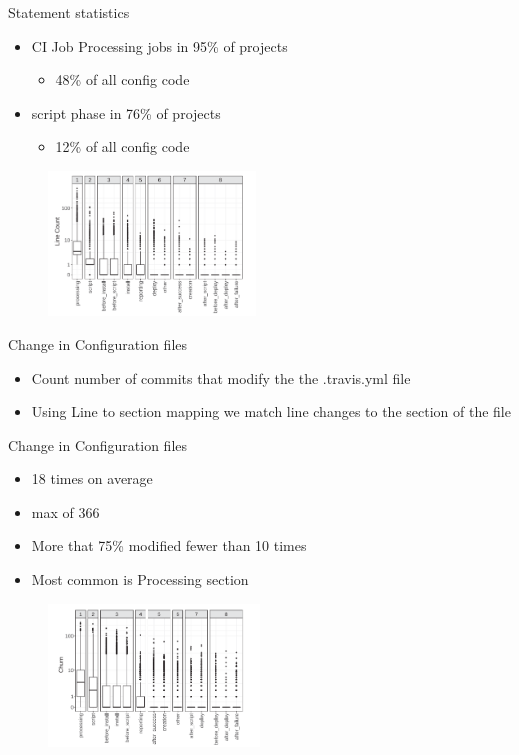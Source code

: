 \documentclass[aspectratio=169,xcolor=dvipsnames]{beamer}
\begin{document}
\begin{frame}{Statement statistics}
    \begin{itemize}
        \item CI Job Processing jobs in 95\% of projects
        \begin{itemize}
            \item 48\% of all config code
        \end{itemize}
        \item script phase in 76\% of projects 
        \begin{itemize}
            \item 12\% of all config code
        \end{itemize}
    \end{itemize}
      \begin{figure}
        \centering
        \includegraphics[width=0.49\textwidth]{images/Line-count-distribution.png}
        \label{fig:my_label}
    \end{figure}
\end{frame}
\begin{frame}{Change in Configuration files}
    \begin{itemize}
        \item Count number of commits that modify the the .travis.yml file
        \item Using Line to section mapping we match line changes to the section of the file
    \end{itemize}
    \end{frame}
\begin{frame}{Change in Configuration files}
    \begin{itemize}
        \item 18 times on average
        \item max of 366
        \item More that 75\% modified fewer than 10 times
        \item Most common is Processing section
    \end{itemize}
    \begin{figure}
        \centering
        \includegraphics[width=0.5\textwidth]{images/Churn.png}
        \label{fig:my_label}
    \end{figure}
\end{frame}
\end{document}
